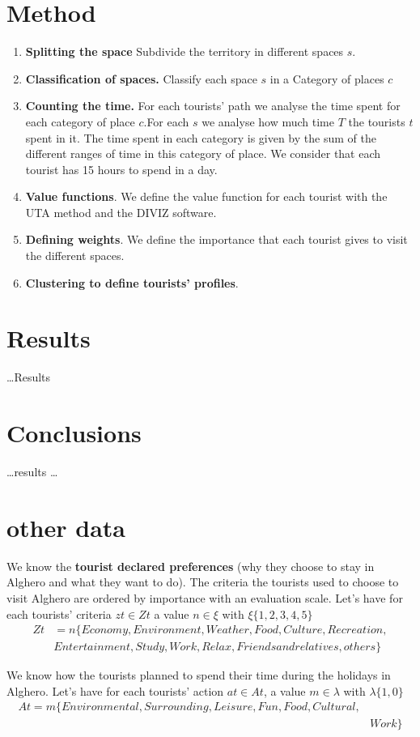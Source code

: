 \documentclass[a4paper]{article}
\begin{document}
\section{Method}


\begin{enumerate}
\item \textbf{Splitting the space} Subdivide the territory in different spaces $s$.
\item \textbf{Classification of spaces.} Classify each space $s$ in a Category of places $c$
\item \textbf{Counting the time.} For each tourists' path we analyse the time spent for each category of place $c$.For each $s$ we analyse how much time $T$ the tourists $t$ spent in it. The time spent in each category is given by the  sum of the different ranges of time in this category of place. We consider that each tourist has 15 hours to spend in a day.
\item \textbf{Value functions}. We define the value function for each tourist with the UTA method and the DIVIZ software.
\item \textbf{Defining weights}. We define the importance that each tourist gives to visit the different spaces.
\item \textbf{Clustering to define tourists' profiles}.

\end{enumerate}


\section{Results}
\dots Results

\section{Conclusions}
\dots results \dots


\section{other data}
We know the \textbf{tourist declared preferences} (why they choose to stay in Alghero and what they want to do). The criteria the tourists used to choose to visit Alghero are ordered by importance with an evaluation scale. Let's have for each tourists' criteria $zt \in Zt$ a value $n \in \xi$ with $\xi\{1,2,3,4,5\}$
\begin{equation}
\begin{split}
Zt&=n\{Economy,Environment,Weather,Food,Culture,Recreation,\\
&Entertainment,Study,Work,Relax,Friends and relatives,others\}
\end{split}
\end{equation}


We know how the tourists planned to spend their time during the holidays in Alghero.  Let's have for each tourists' action $at\in At$, a value $m \in \lambda$ with $\lambda\{1,0\}$
\begin{equation}
\begin{split}
At=m\{Environmental,Surrounding,Leisure,Fun,Food,Cultural,\\
& Work\}
\end{split}
\end{equation}
\end{document}
